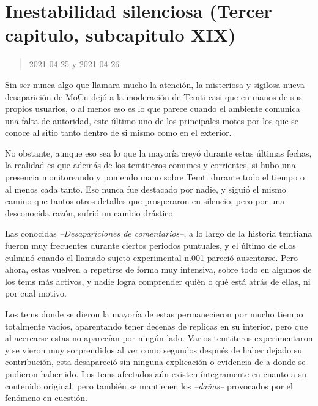 \documentclass[
  spanish,
]{book}
\begin{document}
\hypertarget{inestabilidad-silenciosa-tercer-capitulo-subcapitulo-xix}{%
\section{Inestabilidad silenciosa (Tercer capitulo, subcapitulo XIX)}\label{inestabilidad-silenciosa-tercer-capitulo-subcapitulo-xix}}

\begin{quote}
2021-04-25 y 2021-04-26
\end{quote}

Sin ser nunca algo que llamara mucho la atención, la misteriosa y sigilosa nueva desaparición de MoCn dejó a la moderación de Temti casi que en manos de sus propios usuarios, o al menos eso es lo que parece cuando el ambiente comunica una falta de autoridad, este último uno de los principales motes por los que se conoce al sitio tanto dentro de si mismo como en el exterior.

No obstante, aunque eso sea lo que la mayoría creyó durante estas últimas fechas, la realidad es que además de los temtiteros comunes y corrientes, si hubo una presencia monitoreando y poniendo mano sobre Temti durante todo el tiempo o al menos cada tanto. Eso nunca fue destacado por nadie, y siguió el mismo camino que tantos otros detalles que prosperaron en silencio, pero por una desconocida razón, sufrió un cambio drástico.

Las conocidas \emph{--Desapariciones de comentarios--}, a lo largo de la historia temtiana fueron muy frecuentes durante ciertos periodos puntuales, y el último de ellos culminó cuando el llamado sujeto experimental n.001 pareció ausentarse. Pero ahora, estas vuelven a repetirse de forma muy intensiva, sobre todo en algunos de los tems más activos, y nadie logra comprender quién o qué está atrás de ellas, ni por cual motivo.

Los tems donde se dieron la mayoría de estas permanecieron por mucho tiempo totalmente vacíos, aparentando tener decenas de replicas en su interior, pero que al acercarse estas no aparecían por ningún lado. Varios temtiteros experimentaron y se vieron muy sorprendidos al ver como segundos después de haber dejado su contribución, esta desapareció sin ninguna explicación o evidencia de a donde se pudieron haber ido. Los tems afectados aún existen íntegramente en cuanto a su contenido original, pero también se mantienen los \emph{--daños--} provocados por el fenómeno en cuestión.
\end{document}
